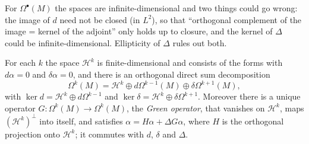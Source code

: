 For $\Omega^\bullet(M)$ the spaces are infinite-dimensional and two things could go wrong: the image of $d$ need not be closed (in $L^2$), so that ``orthogonal complement of the image = kernel of the
adjoint'' only holds up to closure, and the kernel of $\Delta$ could be infinite-dimensional. Ellipticity of $\Delta$ rules out both.

\begin{theorem}\label{hodge-theorem:theorem-decomposition}
For each $k$ the space $\mathcal{H}^k$ is finite-dimensional and consists of the forms with $d\alpha = 0$ and $\delta\alpha = 0$, and there is an orthogonal direct sum decomposition
\[
\Omega^k(M) = \mathcal{H}^k \oplus d\Omega^{k-1}(M) \oplus \delta\Omega^{k+1}(M),
\]
with $\ker d = \mathcal{H}^k \oplus d\Omega^{k-1}$ and $\ker\delta = \mathcal{H}^k \oplus \delta\Omega^{k+1}$. Moreover there is a unique operator $G \colon \Omega^k(M) \to \Omega^k(M)$, the \emph{Green operator},
that vanishes on $\mathcal{H}^k$, maps $(\mathcal{H}^k)^\perp$ into itself, and satisfies $\alpha = H\alpha + \Delta G\alpha$, where $H$ is the orthogonal projection onto $\mathcal{H}^k$; it commutes with $d$,
$\delta$ and $\Delta$.
\end{theorem}

